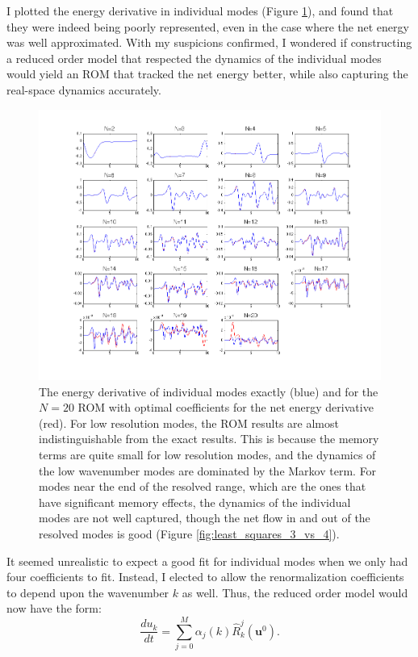 \documentclass{article}
\begin{document}
I plotted the energy derivative in individual modes (Figure \ref{fig:individual_modes}), and found that they were indeed being poorly represented, even in the case where the net energy was well approximated. With my suspicions confirmed, I wondered if constructing a reduced order model that respected the dynamics of the individual modes would yield an ROM that tracked the net energy better, while also capturing the real-space dynamics accurately.

\begin{figure}[h]
\includegraphics[width=\textwidth]{individual_modes.png}
\caption{The energy derivative of individual modes exactly (blue) and for the $N=20$ ROM with optimal coefficients for the net energy derivative (red). For low resolution modes, the ROM results are almost indistinguishable from the exact results. This is because the memory terms are quite small for low resolution modes, and the dynamics of the low wavenumber modes are dominated by the Markov term. For modes near the end of the resolved range, which are the ones that have significant memory effects, the dynamics of the individual modes are not well captured, though the net flow in and out of the resolved modes is good (Figure \ref{fig:least_squares_3_vs_4}).}\label{fig:individual_modes}
\end{figure}

It seemed unrealistic to expect a good fit for individual modes when we only had four coefficients to fit. Instead, I elected to allow the renormalization coefficients to depend upon the wavenumber $k$ as well. Thus, the reduced order model would now have the form:
\begin{equation}\frac{du_k}{dt} = \sum_{j=0}^M \alpha_j(k)\hat{R}_k^j(\mathbf{u}^0).\label{eq:k}
\end{equation}
\end{document}
